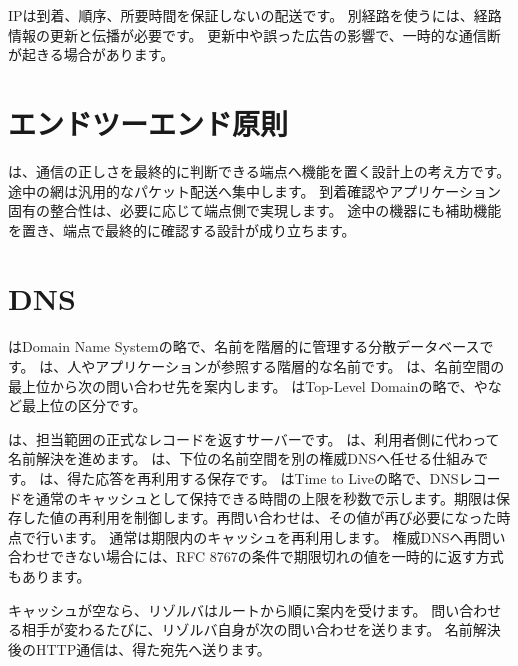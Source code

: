 IPは到着、順序、所要時間を保証しないの配送です。
別経路を使うには、経路情報の更新と伝播が必要です。
更新中や誤った広告の影響で、一時的な通信断が起きる場合があります。

\section{エンドツーエンド原則}

は、通信の正しさを最終的に判断できる端点へ機能を置く設計上の考え方です。
途中の網は汎用的なパケット配送へ集中します。
到着確認やアプリケーション固有の整合性は、必要に応じて端点側で実現します。
途中の機器にも補助機能を置き、端点で最終的に確認する設計が成り立ちます。

\section{DNS}

はDomain Name Systemの略で、名前を階層的に管理する分散データベースです。
は、人やアプリケーションが参照する階層的な名前です。
は、名前空間の最上位から次の問い合わせ先を案内します。
はTop-Level Domainの略で、やなど最上位の区分です。

は、担当範囲の正式なレコードを返すサーバーです。
は、利用者側に代わって名前解決を進めます。
は、下位の名前空間を別の権威DNSへ任せる仕組みです。
は、得た応答を再利用する保存です。
はTime to Liveの略で、DNSレコードを通常のキャッシュとして保持できる時間の上限を秒数で示します。期限は保存した値の再利用を制御します。再問い合わせは、その値が再び必要になった時点で行います。
通常は期限内のキャッシュを再利用します。
権威DNSへ再問い合わせできない場合には、RFC 8767の条件で期限切れの値を一時的に返す方式もあります。

キャッシュが空なら、リゾルバはルートから順に案内を受けます。
問い合わせる相手が変わるたびに、リゾルバ自身が次の問い合わせを送ります。
名前解決後のHTTP通信は、得た宛先へ送ります。


